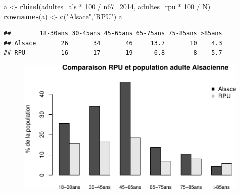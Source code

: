 \documentclass[]{article}
\newenvironment{Shaded}{\begin{snugshade}}{\end{snugshade}}
\newcommand{\KeywordTok}[1]{\textcolor[rgb]{0.13,0.29,0.53}{\textbf{{#1}}}}
\newcommand{\DataTypeTok}[1]{\textcolor[rgb]{0.13,0.29,0.53}{{#1}}}
\newcommand{\DecValTok}[1]{\textcolor[rgb]{0.00,0.00,0.81}{{#1}}}
\newcommand{\FloatTok}[1]{\textcolor[rgb]{0.00,0.00,0.81}{{#1}}}
\newcommand{\StringTok}[1]{\textcolor[rgb]{0.31,0.60,0.02}{{#1}}}
\newcommand{\OtherTok}[1]{\textcolor[rgb]{0.56,0.35,0.01}{{#1}}}
\newcommand{\NormalTok}[1]{{#1}}
\begin{document}
\begin{Shaded}
\begin{Highlighting}[]
\NormalTok{a <-}\StringTok{ }\KeywordTok{rbind}\NormalTok{(adultes_als *}\StringTok{ }\DecValTok{100} \NormalTok{/}\StringTok{ }\NormalTok{n67_2014, adultes_rpu *}\StringTok{ }\DecValTok{100} \NormalTok{/}\StringTok{ }\NormalTok{N)}
\KeywordTok{rownames}\NormalTok{(a) <-}\StringTok{ }\KeywordTok{c}\NormalTok{(}\StringTok{"Alsace"}\NormalTok{,}\StringTok{"RPU"}\NormalTok{)}
\NormalTok{a}
\end{Highlighting}
\end{Shaded}

\begin{verbatim}
##        18-30ans 30-45ans 45-65ans 65-75ans 75-85ans >85ans
## Alsace       26       34       46     13.7       10    4.3
## RPU          16       17       19      6.8        8    5.7
\end{verbatim}

\begin{Shaded}
\end{Shaded}

\begin{figure}[htbp]
\centering
\includegraphics{age_files/figure-latex/rpu_pop-1.pdf}
\end{figure}
\end{document}
